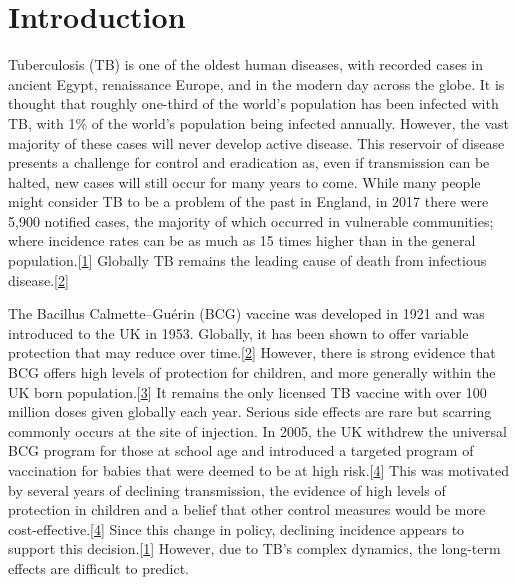 \documentclass[11pt,twoside]{bristolthesis}
\begin{document}
  \mainmatter %
  \pagestyle{fancyplain} %

  \hypertarget{introduction}{%
  \chapter{Introduction}\label{introduction}}
  
  Tuberculosis (TB) is one of the oldest human diseases, with recorded cases in ancient Egypt, renaissance Europe, and in the modern day across the globe. It is thought that roughly one-third of the world's population has been infected with TB, with 1\% of the world's population being infected annually. However, the vast majority of these cases will never develop active disease. This reservoir of disease presents a challenge for control and eradication as, even if transmission can be halted, new cases will still occur for many years to come. While many people might consider TB to be a problem of the past in England, in 2017 there were 5,900 notified cases, the majority of which occurred in vulnerable communities; where incidence rates can be as much as 15 times higher than in the general population.{[}\protect\hyperlink{ref-PHE2017}{1}{]} Globally TB remains the leading cause of death from infectious disease.{[}\protect\hyperlink{ref-TheWorldHealthOrganization:2018va}{2}{]}
  
  The Bacillus Calmette--Guérin (BCG) vaccine was developed in 1921 and was introduced to the UK in 1953. Globally, it has been shown to offer variable protection that may reduce over time.{[}\protect\hyperlink{ref-TheWorldHealthOrganization:2018va}{2}{]} However, there is strong evidence that BCG offers high levels of protection for children, and more generally within the UK born population.{[}\protect\hyperlink{ref-Roy2014}{3}{]} It remains the only licensed TB vaccine with over 100 million doses given globally each year. Serious side effects are rare but scarring commonly occurs at the site of injection. In 2005, the UK withdrew the universal BCG program for those at school age and introduced a targeted program of vaccination for babies that were deemed to be at high risk.{[}\protect\hyperlink{ref-Zwerling2011a}{4}{]} This was motivated by several years of declining transmission, the evidence of high levels of protection in children and a belief that other control measures would be more cost-effective.{[}\protect\hyperlink{ref-Zwerling2011a}{4}{]} Since this change in policy, declining incidence appears to support this decision.{[}\protect\hyperlink{ref-PHE2017}{1}{]} However, due to TB's complex dynamics, the long-term effects are difficult to predict.
  
\end{document}
